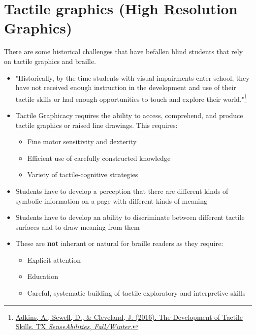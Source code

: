 \documentclass[14pt,letterpaper,twoside]{extreport}
\begin{document}
\pagebreak \hypertarget{tactile-graphics-high-resolution-complex-graphics}{%
	\section{Tactile graphics (High Resolution Graphics)}\label{tactile-graphics-high-resolution-complex-graphics}}
There are some historical challenges that have befallen blind students that rely on tactile graphics and braille. 
\begin{itemize}[leftmargin=*]
\item "Historically, by the time students with visual impairments enter school, they have not received enough instruction in the development and use of their tactile skills or had enough opportunities to touch and explore their world."\footnote{\href{https://www.tsbvi.edu/tx-senseabilities/issues/fall-winter-2016/the-development-of-tactile-skills}{Adkins, A., Sewell, D., \& Cleveland, J. (2016). The Development of Tactile Skills. TX \textit{SenseAbilities, Fall/Winter}.}}
\item Tactile Graphicacy requires the ability to access, comprehend, and produce tactile graphics or raised line drawings. This requires:\begin{itemize}
    \item Fine motor sensitivity and dexterity
    \item Efficient use of carefully constructed knowledge
    \item Variety of tactile-cognitive strategies
\end{itemize}
\item Students have to develop a perception that there are different kinds of symbolic information on a page with different kinds of meaning
\item Students have to develop an ability to discriminate between different tactile surfaces and to draw meaning from them
\item These are \textbf{not} inherant or natural for braille readers as they require:
\begin{itemize}
    \item Explicit attention
    \item Education 
    \item Careful, systematic building of tactile exploratory and interpretive skills
\end{itemize}

\end{itemize}
\end{document}
